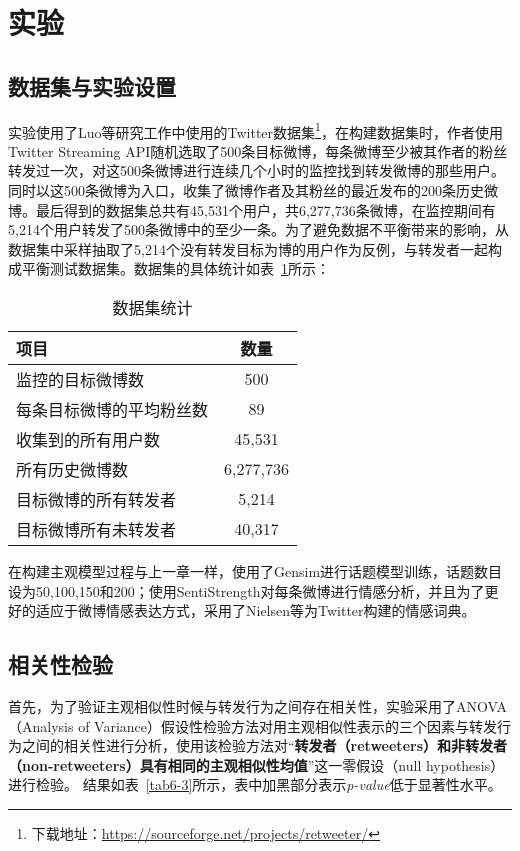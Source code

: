 \section{实验}
\label{experiments}

\subsection{数据集与实验设置}
实验使用了Luo等研究工作中使用的Twitter数据集\footnote{下载地址：\url{https://sourceforge.net/projects/retweeter/}}，在构建数据集时，作者使用Twitter Streaming API随机选取了500条目标微博，每条微博至少被其作者的粉丝转发过一次，对这500条微博进行连续几个小时的监控找到转发微博的那些用户。同时以这500条微博为入口，收集了微博作者及其粉丝的最近发布的200条历史微博。最后得到的数据集总共有45,531个用户，共6,277,736条微博，在监控期间有5,214个用户转发了500条微博中的至少一条。为了避免数据不平衡带来的影响，从数据集中采样抽取了5,214个没有转发目标为博的用户作为反例，与转发者一起构成平衡测试数据集。数据集的具体统计如表~\ref{tab6-2}所示：
\begin{table}[htb]
\centering
\caption{数据集统计}
\label{tab6-2}
\begin{tabular}{|l|c|}
\hline
项目 &数量\\
\hline
监控的目标微博数 & 500 \\
\hline
每条目标微博的平均粉丝数 & 89 \\
\hline
收集到的所有用户数 & 45,531 \\
\hline
所有历史微博数 & 6,277,736 \\
\hline
目标微博的所有转发者 & 5,214 \\
\hline
目标微博所有未转发者 & 40,317  \\
\hline
\end{tabular}
\end{table}

在构建主观模型过程与上一章一样，使用了Gensim进行话题模型训练，话题数目设为50,100,150和200；使用SentiStrength对每条微博进行情感分析，并且为了更好的适应于微博情感表达方式，采用了Nielsen等为Twitter构建的情感词典。

\subsection{相关性检验}
首先，为了验证主观相似性时候与转发行为之间存在相关性，实验采用了ANOVA（Analysis of Variance）假设性检验方法对用主观相似性表示的三个因素与转发行为之间的相关性进行分析，使用该检验方法对“\textbf{转发者（retweeters）和非转发者（non-retweeters）具有相同的主观相似性均值}”这一零假设（null hypothesis）进行检验。
结果如表~\ref{tab6-3}所示，表中加黑部分表示\textit{p-value}低于显著性水平。

